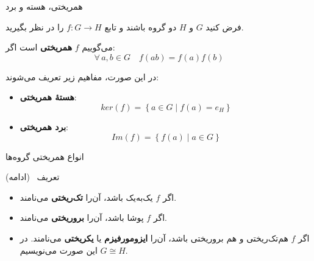 \begin{frame}[t]{همریختی، هسته و برد}
    \footnotesize
    \setlength{\abovedisplayskip}{3pt}
    \setlength{\belowdisplayskip}{3pt}
    \begin{definition}[همریختی ]
        فرض کنید $G$ و $H$ دو گروه باشند و تابع $f \colon G \to H$ را در نظر بگیرید.

        می‌گوییم $f$ \textbf{همریختی} است اگر:
        \[
            \forall\, a,b \in G \quad f(ab) = f(a)f(b)
        \]

        در این صورت، مفاهیم زیر تعریف می‌شوند:

        \begin{itemize}
            \item \textbf{هستهٔ همریختی}:
                  \[
                      ker (f) = \left\{ a \in G \mid f(a) = e_H \right\}
                  \]

            \item \textbf{برد همریختی}:
                  \[
                      Im (f) = \left\{ f(a) \mid a \in G \right\}
                  \]

        \end{itemize}
    \end{definition}
\end{frame}

\begin{frame}[t]{انواع همریختی گروه‌ها}
    \begin{talert}{تعریف \thedefinition\ (ادامه)}
        \begin{itemize}
            \item اگر $f$ یک‌به‌یک باشد، آن‌را \textbf{تک‌ریختی}  می‌نامند.

            \item اگر $f$ پوشا باشد، آن‌را \textbf{برو‌ریختی}  می‌نامند.

            \item اگر $f$ هم‌تک‌ریختی و هم برو‌ریختی باشد، آن‌را \textbf{ایزومورفیزم} یا \textbf{یکریختی}  می‌نامند. در این صورت می‌نویسیم $G \cong H$.

        \end{itemize}
    \end{talert}
\end{frame}


